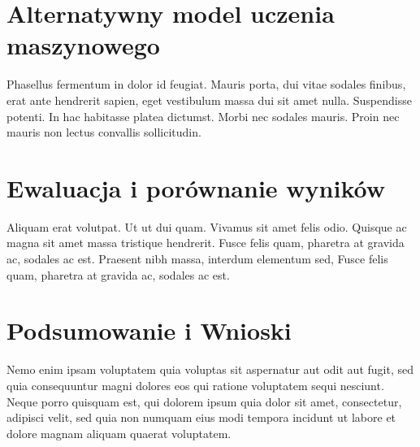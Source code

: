 \documentclass[a4paper,10pt]{article}
\begin{document}
\section{Alternatywny model uczenia maszynowego}

Phasellus fermentum in dolor id feugiat. Mauris porta, dui vitae sodales finibus, erat ante hendrerit sapien, eget vestibulum massa dui sit amet nulla. Suspendisse potenti. In hac habitasse platea dictumst. Morbi nec sodales mauris. Proin nec mauris non lectus convallis sollicitudin.

\section{Ewaluacja i porównanie wyników}

Aliquam erat volutpat. Ut ut dui quam. Vivamus sit amet felis odio. Quisque ac magna sit amet massa tristique hendrerit. Fusce felis quam, pharetra at gravida ac, sodales ac est. Praesent nibh massa, interdum elementum sed, Fusce felis quam, pharetra at gravida ac, sodales ac est.


\section{Podsumowanie i Wnioski}

Nemo enim ipsam voluptatem quia voluptas sit aspernatur aut odit aut fugit, sed quia consequuntur magni dolores eos qui ratione voluptatem sequi nesciunt. Neque porro quisquam est, qui dolorem ipsum quia dolor sit amet, consectetur, adipisci velit, sed quia non numquam eius modi tempora incidunt ut labore et dolore magnam aliquam quaerat voluptatem. 

\end{document}
